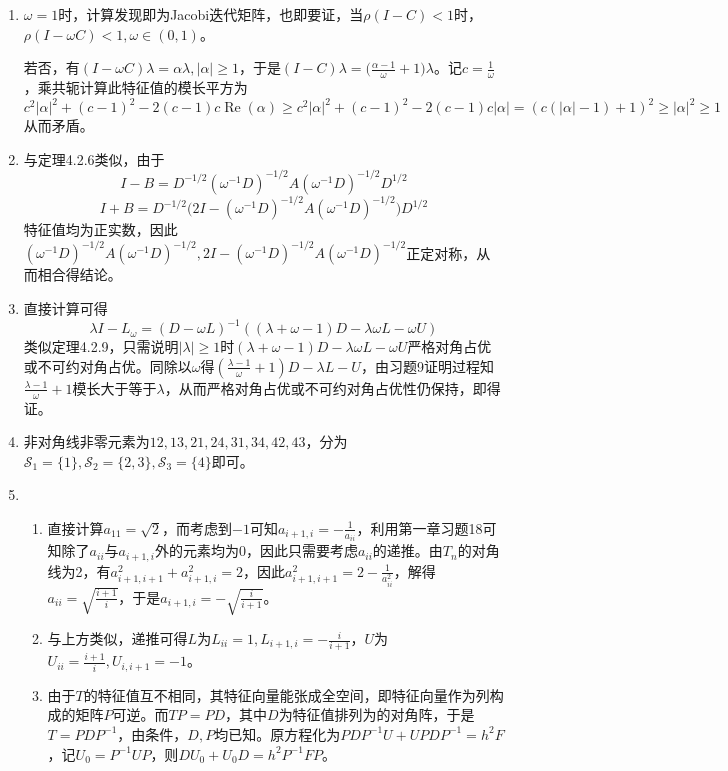 \documentclass[a4paper,UTF8,fontset=windows]{ctexart}
\DeclareMathOperator{\re}{Re}
\begin{document}
\begin{enumerate}
\item
$\omega=1$时，计算发现即为Jacobi迭代矩阵，也即要证，当$\rho(I-C)<1$时，$\rho(I-\omega C)<1,\omega\in(0,1)$。

若否，有$(I-\omega C)\lambda = \alpha\lambda,|\alpha|\ge1$，于是$(I-C)\lambda=\big(\frac{\alpha-1}{\omega}+1\big)\lambda$。记$c=\frac{1}{\omega}$，乘共轭计算此特征值的模长平方为
$$c^2|\alpha|^2+(c-1)^2-2(c-1)c\re(\alpha)\ge c^2|\alpha|^2+(c-1)^2-2(c-1)c|\alpha|=(c(|\alpha|-1)+1)^2\ge|\alpha|^2\ge1$$
从而矛盾。

\item
与定理4.2.6类似，由于
$$I-B=D^{-1/2}(\omega^{-1}D)^{-1/2}A(\omega^{-1}D)^{-1/2}D^{1/2}$$
$$I+B=D^{-1/2}\big(2I-(\omega^{-1}D)^{-1/2}A(\omega^{-1}D)^{-1/2}\big)D^{1/2}$$
特征值均为正实数，因此$(\omega^{-1}D)^{-1/2}A(\omega^{-1}D)^{-1/2},2I-(\omega^{-1}D)^{-1/2}A(\omega^{-1}D)^{-1/2}$正定对称，从而相合得结论。

\item
直接计算可得
$$\lambda I-L_\omega=(D-\omega L)^{-1}((\lambda+\omega-1)D-\lambda\omega L-\omega U)$$
类似定理4.2.9，只需说明$|\lambda|\ge1$时$(\lambda+\omega-1)D-\lambda\omega L-\omega U$严格对角占优或不可约对角占优。同除以$\omega$得$(\frac{\lambda-1}{\omega}+1)D-\lambda L-U$，由习题9证明过程知$\frac{\lambda-1}{\omega}+1$模长大于等于$\lambda$，从而严格对角占优或不可约对角占优性仍保持，即得证。

\item
非对角线非零元素为$12,13,21,24,31,34,42,43$，分为$\mathcal{S}_1=\{1\},\mathcal{S}_2=\{2,3\},\mathcal{S}_3=\{4\}$即可。

\item
\begin{enumerate}
\item
直接计算$a_{11}=\sqrt{2}$，而考虑到$-1$可知$a_{i+1,i}=-\frac{1}{a_{ii}}$，利用第一章习题18可知除了$a_{ii}$与$a_{i+1,i}$外的元素均为0，因此只需要考虑$a_{ii}$的递推。由$T_n$的对角线为2，有$a_{i+1,i+1}^2+a_{i+1,i}^2=2$，因此$a_{i+1,i+1}^2=2-\frac{1}{a_{ii}^2}$，解得$a_{ii}=\sqrt{\frac{i+1}{i}}$，于是$a_{i+1,i}=-\sqrt{\frac{i}{i+1}}$。

\item
与上方类似，递推可得$L$为$L_{ii}=1,L_{i+1,i}=-\frac{i}{i+1}$，$U$为$U_{ii}=\frac{i+1}{i},U_{i,i+1}=-1$。

\item
由于$T$的特征值互不相同，其特征向量能张成全空间，即特征向量作为列构成的矩阵$P$可逆。而$TP=PD$，其中$D$为特征值排列为的对角阵，于是$T=PDP^{-1}$，由条件，$D,P$均已知。原方程化为$PDP^{-1}U+UPDP^{-1}=h^2F$，记$U_0=P^{-1}UP$，则$DU_0+U_0D=h^2P^{-1}FP$。


\end{enumerate}
\end{enumerate}
\end{document}
